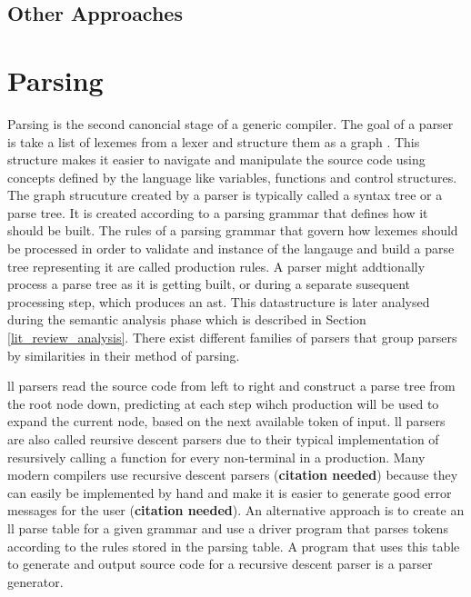 \subsection{Other Approaches} \label{other_approaches}

\begin{comment}
\cite{sinya_simultaneous_2013} propose a novel type of finite automata called
\gls{sfa}.
\newline \newline
Mention \cite{lin_accelerating_2013, wang_hyperscan_2019,
li_plex_2021, asthagiri_associative_1992} Go and look at references cited in
\cite{zhao_--fly_2015}
\newline \newline
Could mention these but the fella doesn't do anything novel (and his
grammar is questionable) \cite{barve_parallel_2014, barve_parallel_2012,
barve_improved_2015}
\end{comment}

\section{Parsing} \label{lit_review_parsing}

Parsing is the second canoncial stage of a generic compiler. The goal of a
parser is take a list of lexemes from a lexer and structure them as a graph
\citep{scott_programming_2015}. This structure makes it easier to navigate
and manipulate the source code using concepts defined by the language like
variables, functions and control structures. The graph strucuture created
by a parser is typically called a syntax tree or a parse tree. It is created
according to a parsing grammar that defines how it should be built. The rules
of a parsing grammar that govern how lexemes should be processed in order to
validate and instance of the langauge and build a parse tree representing it are
called production rules. A parser might addtionally process a parse tree as it
is getting built, or during a separate susequent processing step, which produces
an \gls{ast}. This datastructure is later analysed during the semantic analysis
phase which is described in Section \ref{lit_review_analysis}. There exist
different families of parsers that group parsers by similarities in their method
of parsing.

\gls{ll} parsers read the source code from left to right and construct a
parse tree from the root node down, predicting at each step wihch production
will be used to expand the current node, based on the next available token of
input. \gls{ll} parsers are also called reursive descent parsers due to their
typical implementation of resursively calling a function for every non-terminal
in a production. Many modern compilers use recursive descent parsers
(\textbf{citation needed}) because they can easily be implemented by hand and
make it is easier to generate good error messages for the user (\textbf{citation
needed}). An alternative approach is to create an \gls{ll} parse table for a
given grammar and use a driver program that parses tokens according to the rules
stored in the parsing table. A program that uses this table to generate and
output source code for a recursive descent parser is a parser generator.

